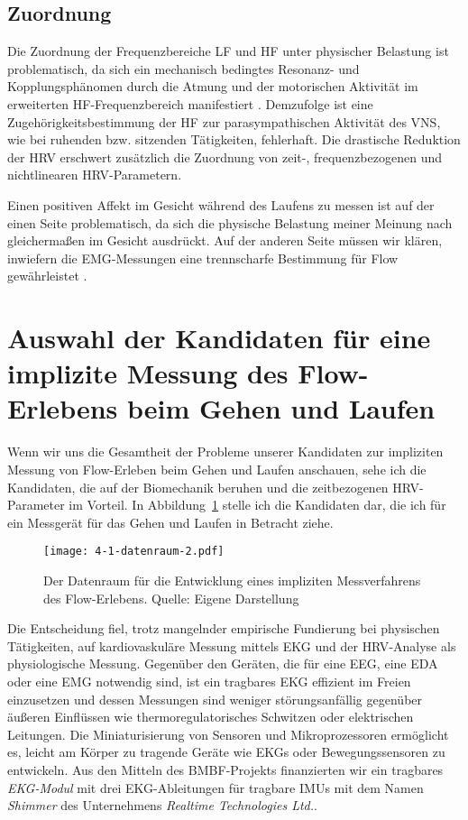 \subsection{Zuordnung}
\label{sub:zuordnung}
Die Zuordnung der Frequenzbereiche \ac{LF} und \ac{HF} unter physischer Belastung ist problematisch, da sich ein mechanisch bedingtes Resonanz- und Kopplungsphänomen durch die Atmung und der motorischen Aktivität im erweiterten \ac{HF}-Frequenzbereich manifestiert \citep[vgl.][S.~62]{Hoos2010}. Demzufolge ist eine Zugehörigkeitsbestimmung der \ac{HF} zur parasympathischen Aktivität des \ac{VNS}, wie bei ruhenden bzw. sitzenden Tätigkeiten, fehlerhaft. Die drastische Reduktion der \ac{HRV} erschwert zusätzlich die Zuordnung von zeit-, frequenzbezogenen und nichtlinearen \ac{HRV}-Parametern.

Einen positiven Affekt im Gesicht während des Laufens zu messen ist auf der einen Seite problematisch, da sich die physische Belastung meiner Meinung nach gleichermaßen im Gesicht ausdrückt. Auf der anderen Seite müssen wir klären, inwiefern die \ac{EMG}-Messungen eine trennscharfe Bestimmung für Flow gewährleistet \citep[vgl.][]{Peifer2012}.

\section{Auswahl der Kandidaten für eine implizite Messung des Flow-Erlebens beim Gehen und Laufen}
\label{sec:auswahl_der_kandidaten}
Wenn wir uns die Gesamtheit der Probleme unserer Kandidaten zur impliziten Messung von Flow-Erleben beim Gehen und Laufen anschauen, sehe ich die Kandidaten, die auf der Biomechanik beruhen und die zeitbezogenen \ac{HRV}-Parameter im Vorteil. In Abbildung~\ref{fig:4_1_datenraum} stelle ich die Kandidaten dar, die ich für ein Messgerät für das Gehen und Laufen in Betracht ziehe.

\begin{figure}[t]
	\centering
		\texttt{[image: 4-1-datenraum-2.pdf]}
	\caption[Der Datenraum für die Entwicklung eines impliziten Messverfahrens des Flow-Erlebens]{Der Datenraum für die Entwicklung eines impliziten Messverfahrens des Flow-Erlebens. Quelle: Eigene Darstellung}
	\label{fig:4_1_datenraum}
\end{figure}

Die Entscheidung fiel, trotz mangelnder empirische Fundierung bei physischen Tätigkeiten, auf kardiovaskuläre Messung mittels \ac{EKG} und der \ac{HRV}-Analyse als physiologische Messung. Gegenüber den Geräten, die für eine \ac{EEG}, eine \ac{EDA} oder eine \ac{EMG} notwendig sind, ist ein tragbares \ac{EKG} effizient im Freien einzusetzen und dessen Messungen sind weniger störungsanfällig gegenüber äußeren Einflüssen wie thermoregulatorisches Schwitzen oder elektrischen Leitungen. Die Miniaturisierung von Sensoren und Mikroprozessoren ermöglicht es, leicht am Körper zu tragende Geräte wie \acp{EKG} oder Bewegungssensoren zu entwickeln. Aus den Mitteln des \acs{BMBF}-Projekts finanzierten wir ein tragbares \emph{EKG-Modul} mit drei \ac{EKG}-Ableitungen für tragbare \acp{IMU} mit dem Namen \emph{Shimmer} des Unternehmens \emph{Realtime Technologies Ltd.}.

